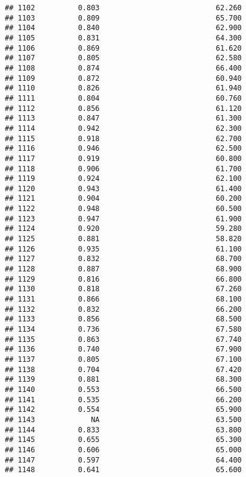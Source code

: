 \documentclass[
]{article}
\begin{document}
\begin{verbatim}
## 1102          0.803                           62.260
## 1103          0.809                           65.700
## 1104          0.840                           62.900
## 1105          0.831                           64.300
## 1106          0.869                           61.620
## 1107          0.805                           62.580
## 1108          0.874                           66.400
## 1109          0.872                           60.940
## 1110          0.826                           61.940
## 1111          0.804                           60.760
## 1112          0.856                           61.120
## 1113          0.847                           61.300
## 1114          0.942                           62.300
## 1115          0.918                           62.700
## 1116          0.946                           62.500
## 1117          0.919                           60.800
## 1118          0.906                           61.700
## 1119          0.924                           62.100
## 1120          0.943                           61.400
## 1121          0.904                           60.200
## 1122          0.948                           60.500
## 1123          0.947                           61.900
## 1124          0.920                           59.280
## 1125          0.881                           58.820
## 1126          0.935                           61.100
## 1127          0.832                           68.700
## 1128          0.887                           68.900
## 1129          0.816                           66.800
## 1130          0.818                           67.260
## 1131          0.866                           68.100
## 1132          0.832                           66.200
## 1133          0.856                           68.500
## 1134          0.736                           67.580
## 1135          0.863                           67.740
## 1136          0.740                           67.900
## 1137          0.805                           67.100
## 1138          0.704                           67.420
## 1139          0.881                           68.300
## 1140          0.553                           66.500
## 1141          0.535                           66.200
## 1142          0.554                           65.900
## 1143             NA                           63.500
## 1144          0.833                           63.800
## 1145          0.655                           65.300
## 1146          0.606                           65.000
## 1147          0.597                           64.400
## 1148          0.641                           65.600

\end{verbatim}
\end{document}
